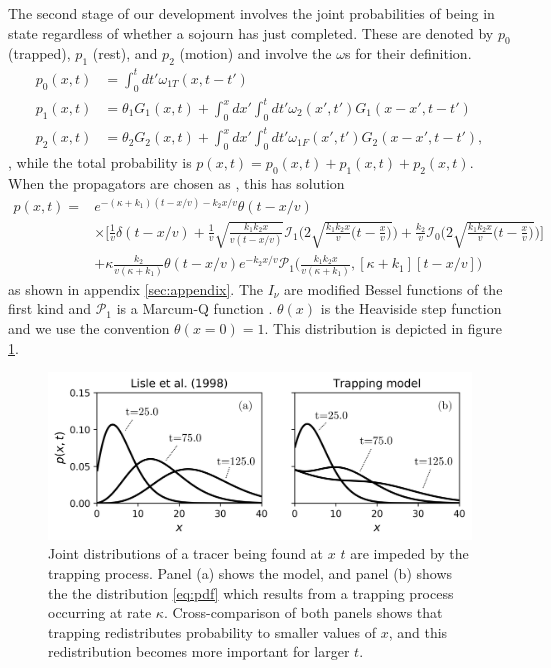 \documentclass[]{agujournal2018}
\begin{document}
The second stage of our development involves the joint probabilities of being in state regardless of whether a sojourn has just completed. These are denoted by  $p_0$ (trapped), $p_1$ (rest), and $p_2$ (motion) and involve the $\omega$s for their definition.
\begin{align}
p_0(x,t) &= \int_0^t dt' \omega_{1T}(x,t-t')\\
p_1(x,t) &= \theta_1 G_1(x,t) + \int_0^x dx' \int_0^t dt' \omega_2(x',t')G_1(x-x',t-t')\\
p_2(x,t) &= \theta_2 G_2(x,t) + \int_0^x dx' \int_0^t dt' \omega_{1F}(x',t')G_2(x-x',t-t'),
\end{align},
while the total probability is $p(x,t) = p_0(x,t) + p_1(x,t) + p_2(x,t)$.
When the propagators are chosen as \citet{Lisle1998}, this has solution 
\begin{align}
p(x,t) = &e^{-(\kappa + k_1)(t-x/v)-k_2x/v} \theta(t-x/v)\\
&\times \Bigg[\frac{1}{v}\delta(t-x/v) + \frac{1}{v}\sqrt{\frac{k_1k_2x}{v(t-x/v)}}\mathcal{I}_1\Bigg(2\sqrt{\frac{k_1k_2x}{v}\Big(t-\frac{x}{v}\Big)}\Bigg) +\frac{k_2}{v}\mathcal{I}_0\Bigg(2\sqrt{\frac{k_1k_2x}{v}\Big(t-\frac{x}{v}\Big)}\Bigg) \Bigg]\\
&+ \kappa\frac{ k_2}{v(\kappa+k_1)}\theta(t-x/v)e^{-k_2x/v}\mathcal{P}_1\Big(\frac{k_1k_2x}{v(\kappa+k_1)},[\kappa+k_1][t-x/v] \Big)
\label{eq:pdf}
\end{align}
as shown in appendix \ref{sec:appendix}. The $I_\nu$ are modified Bessel functions of the first kind and $\mathcal{P}_1$ is a Marcum-Q function \citep{Marcum1960,Temme1996}. $\theta(x)$ is the Heaviside step function and we use the convention $\theta(x=0)=1$.
This distribution is depicted in figure \ref{fig:pdfs}.
\begin{figure}
	\includegraphics[width=\linewidth,keepaspectratio]{./figures/pdf-plot-edit.png}
	\caption{Joint distributions of a tracer being found at $x$ $t$ are impeded by the trapping process. Panel (a) shows the \citet{Lisle1998} model, and panel (b) shows the the distribution \ref{eq:pdf} which results from a trapping process occurring at rate $\kappa$. Cross-comparison of both panels shows that trapping redistributes probability to smaller values of $x$, and this redistribution becomes more important for larger $t$.}
	\label{fig:pdfs}
\end{figure}
\end{document}
